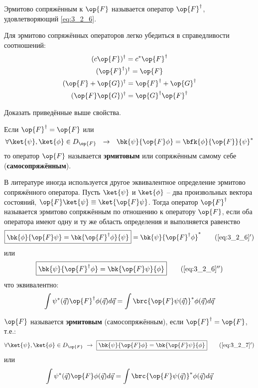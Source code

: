 \begin{defn}
Эрмитово сопряжённым к $\op{F}$ называется оператор $\op{F}^\dag$, удовлетворяющий \eqref{eq:3_2_6}.
\end{defn}

Для эрмитово сопряжённых операторов легко убедиться в справедливости соотношений:
$$
\begin{gathered}
(c\op{F})^\dag = c^* \op{F}^\dag \\
(\op{F}^\dag)^\dag = \op{F} \\
(\op{F} + \op{G})^\dag = \op{F}^\dag + \op{G}^\dag \\
(\op{F}\op{G})^\dag = \op{G}^\dag \op{F}^\dag
\end{gathered}
$$

\begin{excr}
Доказать приведённые выше свойства.
\end{excr}

\begin{defn}
Если $\op{F}^\dag = \op{F}$ или
\begin{equation}
\label{eq:3_2_7}
\forall \ket{\psi},\ket{\phi} \in D_{\op{F}} ~~\to~~
  \bk{\psi}{\op{F}\phi} = \bfk{\phi}{\op{F}}{\psi}^*
\end{equation}
то оператор $\op{F}$ называется \textbf{эрмитовым} или сопряжённым самому себе (\textbf{самосопряжённым}).
\end{defn}

В литературе иногда используется другое эквивалентное определение эрмитово сопряжённого оператора. Пусть $\ket{\psi}$ и $\ket{\phi}$ -- два произвольных вектора состояний, $\op{F}\ket{\psi} \equiv \ket{\op{F}\psi}$. Тогда оператор $\op{F}^\dag$ называется эрмитово сопряжённым по отношению к оператору $\op{F}$, если оба оператора имеют одну и ту же область определения и выполняется равенство
\begin{equation}
\label{eq:3_2_6_add}
\boxed{
	\bk{\phi}{\op{F}\psi} = \bk{\op{F}^\dag\phi}{\psi}
} = \bk{\psi}{\op{F}^\dag \phi}^*
\tag{\ref{eq:3_2_6}$'$}
\end{equation}
или
\begin{equation}
\label{eq:3_2_6_add_x2}
\boxed{
	\bk{\psi}{\op{F}^\dag \phi} = \bk{\op{F} \psi}{\phi}
}
\tag{\ref{eq:3_2_6}$''$}
\end{equation}
что эквивалентно:
$$
\int \psi^*(\vec{q}) \op{F}^\dag \phi(\vec{q}) d\vec{q}
  = \int \brc{\op{F} \psi(\vec{q})}^* \phi(\vec{q}) d\vec{q}
$$

\begin{defn}
$\op{F}$ называется \textbf{эрмитовым} (самосопряжённым), если $\op{F}^\dag = \op{F}$, т.е.:
\begin{equation}
\label{eq:3_2_7_add}
\forall \ket{\psi}, \ket{\phi} \in D_{\op{F}}  ~\to~ \boxed{ \bk{\psi}{\op{F} \phi} = \bk{\op{F}\psi}{\phi} }
\tag{\ref{eq:3_2_7}$'$}
\end{equation}
или
$$
\int \psi^*(\vec{q}) \op{F} \phi(\vec{q}) d\vec{q}
  = \int \brc{\op{F} \psi(\vec{q})}^* \phi(\vec{q}) d\vec{q}
$$
\end{defn}

